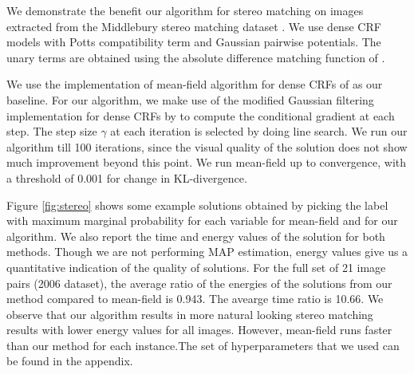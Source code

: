 \label{subsec:stereo}
 We demonstrate the benefit our algorithm for stereo matching on images extracted from the Middlebury stereo matching dataset \citep{scharstein2001taxonomy}. We use dense CRF models with Potts compatibility term and Gaussian pairwise potentials. The unary terms are obtained using the absolute difference matching function of \citep{scharstein2001taxonomy}. 

 We use the implementation of mean-field algorithm for
dense CRFs of \citep{koltun2011efficient} as our baseline. For our algorithm,
we make use of the modified Gaussian filtering implementation for dense CRFs by
\citep{ajanthan2017efficient} to compute the conditional gradient at each step.
The step size $\gamma$ at each iteration is selected by doing line search. We
run our algorithm till 100 iterations, since the visual quality of the solution
does not show much improvement beyond this point. We run mean-field up to
convergence, with a threshold of 0.001 for change in KL-divergence. 

 Figure \ref{fig:stereo} shows some example solutions obtained by picking the
label with maximum marginal probability for each variable for mean-field and
for our algorithm. We also report the time and energy values of the solution
for both methods. Though we are not performing MAP estimation, energy values
give us a quantitative indication of the quality of solutions. For the full set of
21 image pairs (2006 dataset), the average ratio of the energies of the solutions from our method 
compared to mean-field is 0.943. The avearge time ratio is 10.66. We observe that our algorithm results in more natural looking stereo matching results with lower energy values for all images. However, mean-field runs faster than our method for each instance.The set of hyperparameters that we used can be found in the
appendix.


